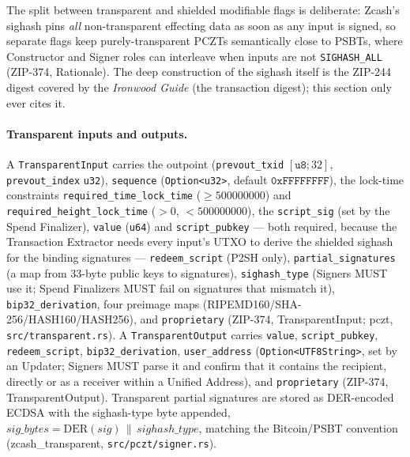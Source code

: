 \documentclass[11pt,a4paper]{article}
\theoremstyle{definition}
\begin{document}
The split between transparent and shielded modifiable flags is
deliberate: Zcash's sighash pins \emph{all} non-transparent effecting
data as soon as any input is signed, so separate flags keep
purely-transparent PCZTs semantically close to PSBTs, where Constructor
and Signer roles can interleave when inputs are not \texttt{SIGHASH\_ALL}
(ZIP-374, Rationale). The deep construction of the sighash itself is the
ZIP-244 digest covered by the \emph{Ironwood Guide} (the transaction
digest); this section only ever cites it.

\paragraph{Transparent inputs and outputs.} A
\texttt{TransparentInput} carries the outpoint
(\texttt{prevout\_txid} $[\mathtt{u8};32]$, \texttt{prevout\_index}
\texttt{u32}), \texttt{sequence} (\texttt{Option<u32>}, default
$\mathtt{0xFFFFFFFF}$), the lock-time constraints
\texttt{required\_time\_lock\_time} (${}\ge 500000000$) and
\texttt{required\_height\_lock\_time} (${}>0$, ${}<500000000$), the
\texttt{script\_sig} (set by the Spend Finalizer), \texttt{value}
(\texttt{u64}) and \texttt{script\_pubkey} --- both required, because the
Transaction Extractor needs every input's UTXO to derive the shielded
sighash for the binding signatures --- \texttt{redeem\_script}
(P2SH only), \texttt{partial\_signatures} (a map from $33$-byte public
keys to signatures), \texttt{sighash\_type} (Signers MUST use it; Spend
Finalizers MUST fail on signatures that mismatch it),
\texttt{bip32\_derivation}, four preimage maps
(RIPEMD160/SHA-256/HASH160/HASH256), and \texttt{proprietary} (ZIP-374,
TransparentInput; \textsf{pczt}, \texttt{src/transparent.rs}). A
\texttt{TransparentOutput} carries \texttt{value},
\texttt{script\_pubkey}, \texttt{redeem\_script},
\texttt{bip32\_derivation}, \texttt{user\_address}
(\texttt{Option<UTF8String>}, set by an Updater; Signers MUST parse it and
confirm that it contains the recipient, directly or as a receiver within a
Unified Address), and \texttt{proprietary} (ZIP-374, TransparentOutput).
Transparent partial signatures are stored as DER-encoded ECDSA with the
sighash-type byte appended,
$\mathit{sig\_bytes} = \mathrm{DER}(\mathit{sig}) \,\|\,
\mathit{sighash\_type}$, matching the Bitcoin/PSBT convention
(\textsf{zcash\_transparent}, \texttt{src/pczt/signer.rs}).
\end{document}
